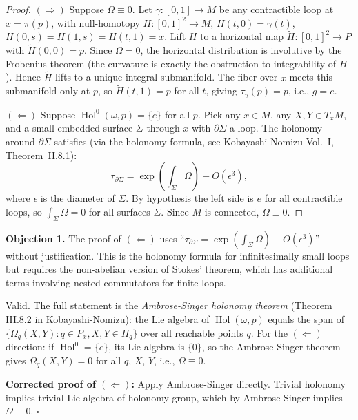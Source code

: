\documentclass[12pt]{amsart}
\theoremstyle{plain}
\theoremstyle{definition}
\DeclareMathOperator{\Hol}{Hol}
\begin{document}
\begin{proof}
$(\Rightarrow)$ Suppose $\Omega \equiv 0$. Let $\gamma: [0,1] \to M$ be any
contractible loop at $x = \pi(p)$, with null-homotopy $H: [0,1]^2 \to M$,
$H(t,0) = \gamma(t)$, $H(0,s) = H(1,s) = H(t,1) = x$. Lift $H$ to a
horizontal map $\tilde H: [0,1]^2 \to P$ with $\tilde H(0,0) = p$. Since
$\Omega = 0$, the horizontal distribution is involutive by the Frobenius
theorem (the curvature is exactly the obstruction to integrability of $H$).
Hence $\tilde H$ lifts to a unique integral submanifold. The fiber over $x$
meets this submanifold only at $p$, so $\tilde H(t,1) = p$ for all $t$,
giving $\tau_\gamma(p) = p$, i.e., $g = e$.

$(\Leftarrow)$ Suppose $\Hol^0(\omega,p) = \{e\}$ for all $p$. Pick any
$x \in M$, any $X, Y \in T_x M$, and a small embedded surface $\Sigma$
through $x$ with $\partial\Sigma$ a loop. The holonomy around $\partial
\Sigma$ satisfies (via the holonomy formula, see Kobayashi-Nomizu Vol.~I,
Theorem~II.8.1):
\[
  \tau_{\partial\Sigma} = \exp\!\left(\int_\Sigma \Omega\right) + O(\epsilon^3),
\]
where $\epsilon$ is the diameter of $\Sigma$. By hypothesis the left side is
$e$ for all contractible loops, so $\int_\Sigma \Omega = 0$ for all
surfaces $\Sigma$. Since $M$ is connected, $\Omega \equiv 0$.
\end{proof}

\begin{auditbox}
\textbf{Objection 1.} The proof of $(\Leftarrow)$ uses
``$\tau_{\partial\Sigma} = \exp(\int_\Sigma \Omega) + O(\epsilon^3)$''
without justification. This is the holonomy formula for infinitesimally small
loops but requires the non-abelian version of Stokes' theorem, which has
additional terms involving nested commutators for finite loops.
\end{auditbox}

\begin{replybox}
Valid. The full statement is the \emph{Ambrose-Singer holonomy theorem}
(Theorem III.8.2 in Kobayashi-Nomizu): the Lie algebra of $\Hol(\omega,p)$
equals the span of $\{\Omega_q(X,Y) : q \in P_x, X,Y \in H_q\}$ over all
reachable points $q$. For the $(\Leftarrow)$ direction: if $\Hol^0 =
\{e\}$, its Lie algebra is $\{0\}$, so the Ambrose-Singer theorem gives
$\Omega_q(X,Y) = 0$ for all $q$, $X$, $Y$, i.e., $\Omega \equiv 0$.

\textbf{Corrected proof of $(\Leftarrow)$:} Apply Ambrose-Singer directly.
Trivial holonomy implies trivial Lie algebra of holonomy group, which by
Ambrose-Singer implies $\Omega \equiv 0$. \hfill $\square$
\end{replybox}
\end{document}
